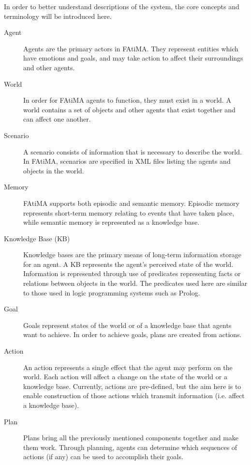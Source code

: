 \documentclass{article}
\begin{document}
In order to better understand descriptions of the system, the core concepts and 
terminology will be introduced here.

\begin{description}

\item[Agent]
  Agents are the primary actors in FAtiMA.  They represent entities which have emotions
  and goals, and may take action to affect their surroundings and other agents.

\item[World]
  In order for FAtiMA agents to function, they must exist in a world.  A world contains
  a set of objects and other agents that exist together and can affect one another.

\item[Scenario]
  A scenario consists of information that is necessary to describe the world.  In
  FAtiMA, scenarios are specified in XML files listing the agents and objects
  in the world.

\item[Memory]
  FAtiMA supports both episodic and semantic memory.  Episodic memory represents 
  short-term memory relating to events that have taken place, while semantic
  memory is represented as a knowledge base.

\item[Knowledge Base (KB)]
  Knowledge bases are the primary means of long-term information storage for
  an agent.  A KB represents the agent's perceived state of the world.  Information
  is represented through use of predicates representing facts or relations
  between objects in the world.  The predicates used here are similar to those
  used in logic programming systems such as Prolog.

\item[Goal]
  Goals represent states of the world or of a knowledge base that agents want
  to achieve.  In order to achieve goals, plans are created from actions.

\item[Action]
  An action represents a single effect that the agent may perform on the world.
  Each action will affect a change on the state of the world or a knowledge base.
  Currently, actions are pre-defined, but the aim here is to enable construction
  of those actions which transmit information (i.e. affect a knowledge base).

\item[Plan]
  Plans bring all the previously mentioned components together and make them
  work.  Through planning, agents can determine which sequences of actions (if any)
  can be used to accomplish their goals.

\end{description}
\end{document}
